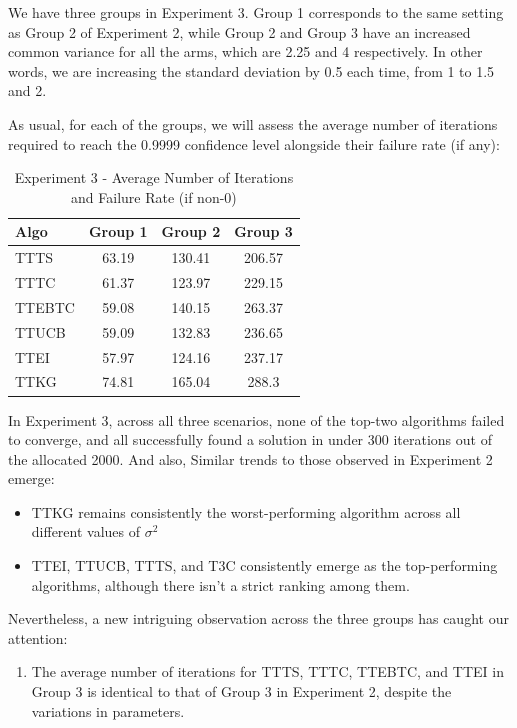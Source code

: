 \documentclass[a4paper, 12pt]{article}
\theoremstyle{definition}
\begin{document}
We have three groups in Experiment 3. Group 1 corresponds to the same setting as Group 2 of Experiment 2, while Group 2 and Group 3 have an increased common variance for all the arms, which are 2.25 and 4 respectively. In other words, we are increasing the standard deviation by 0.5 each time, from 1 to 1.5 and 2.

As usual, for each of the groups, we will assess the average number of iterations required to reach the 0.9999 confidence level alongside their failure rate (if any):

\begin{table}[hbt!]
\centering
\begin{tabular}{lccc}
\hline
Algo & Group 1 & Group 2 & Group 3 \\
\hline
TTTS & 63.19 & 130.41 & 206.57\\
TTTC & 61.37 & 123.97 & 229.15\\
TTEBTC & 59.08 & 140.15 & 263.37\\
TTUCB & 59.09 & 132.83 & 236.65\\
TTEI & 57.97 & 124.16 & 237.17\\
TTKG & 74.81 & 165.04 & 288.3\\
\hline
\end{tabular}
\caption{Experiment 3 - Average Number of Iterations and Failure Rate (if non-0)}
\label{table:exp3_iter}
\end{table}

In Experiment 3, across all three scenarios, none of the top-two algorithms failed to converge, and all successfully found a solution in under 300 iterations out of the allocated 2000. And also, Similar trends to those observed in Experiment 2 emerge:
\begin{itemize}
    \item TTKG remains consistently the worst-performing algorithm across all different values of $\sigma^2$
    \item TTEI, TTUCB, TTTS, and T3C consistently emerge as the top-performing algorithms, although there isn't a strict ranking among them.
\end{itemize}

Nevertheless, a new intriguing observation across the three groups has caught our attention:

\begin{enumerate}
    \item The average number of iterations for TTTS, TTTC, TTEBTC, and TTEI in Group 3 is identical to that of Group 3 in Experiment 2, despite the variations in parameters.
\end{enumerate}
\end{document}
